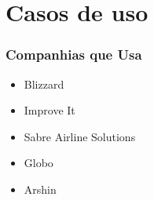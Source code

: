 \documentclass[10pt]{beamer}
\begin{document}
\section{Casos de uso}
\begin{frame}
  \frametitle{Companhias que Usa}
  \begin{itemize}
  \item Blizzard
  \item Improve It
  \item Sabre Airline Solutions
  \item Globo
  \item Arshin
  \end{itemize}
\end{frame}
\end{document}
